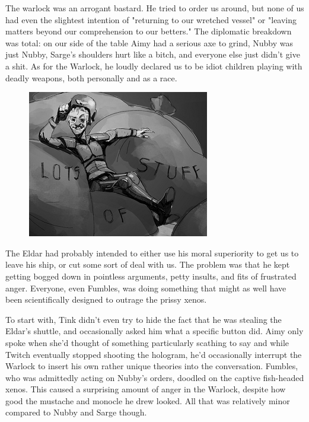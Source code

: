 The warlock was an arrogant bastard. 
He tried to order us around, but none of us had even the slightest intention of "returning to our wretched vessel" or "leaving matters beyond our comprehension to our betters." The diplomatic breakdown was total: 
on our side of the table Aimy had a serious axe to grind, Nubby was just Nubby, Sarge's shoulders hurt like a bitch, and everyone else just didn't give a shit. 
As for the Warlock, he loudly declared us to be idiot children playing with deadly weapons, both personally and as a race.

\begin{figure}
	\begin{center}
		\includegraphics[width=\figwidth]{pics/11/59.png}
	\end{center}
\end{figure}
The Eldar had probably intended to either use his moral superiority to get us to leave his ship, or cut some sort of deal with us. 
The problem was that he kept getting bogged down in pointless arguments, petty insults, and fits of frustrated anger. 
Everyone, even Fumbles, was doing something that might as well have been scientifically designed to outrage the prissy xenos.

To start with, Tink didn't even try to hide the fact that he was stealing the Eldar's shuttle, and occasionally asked him what a specific button did. 
Aimy only spoke when she'd thought of something particularly scathing to say and while Twitch eventually stopped shooting the hologram, he'd occasionally interrupt the Warlock to insert his own rather unique theories into the conversation. 
Fumbles, who was admittedly acting on Nubby's orders, doodled on the captive fish-headed xenos. 
This caused a surprising amount of anger in the Warlock, despite how good the mustache and monocle he drew looked. 
All that was relatively minor compared to Nubby and Sarge though.

